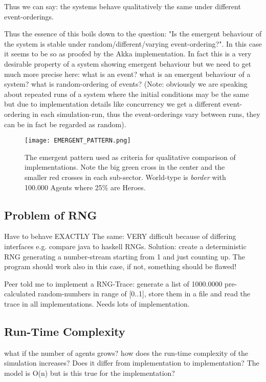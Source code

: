 Thus we can say: the systems behave qualitatively the same under different event-orderings.

Thus the essence of this boils down to the question: "Is the emergent behaviour of the system is stable under random/different/varying event-ordering?". In this case it seems to be so as proofed by the Akka implementation. In fact this is a very desirable property of a system showing emergent behaviour but we need to get much more precise here: what is an event? what is an emergent behaviour of a system? what is random-ordering of events? (Note: obviously we are speaking about repeated runs of a system where the initial conditions may be the same but due to implementation details like concurrency we get a different event-ordering in each simulation-run, thus the event-orderings vary between runs, they can be in fact be regarded as random).

\begin{figure}[H]
	\centering
  \texttt{[image: EMERGENT\_PATTERN.png]}
  	\caption{The emergent pattern used as criteria for qualitative comparison of implementations. Note the big green cross in the center and the smaller red crosses in each sub-sector. World-type is \textit{border} with 100.000 Agents where 25\% are Heroes.}
	\label{fig:EMERGENT_PATTERN}
\end{figure}


\subsection{Problem of RNG}
Have to behave EXACTLY The same: VERY difficult because of differing interfaces e.g. compare java to haskell RNGs.
Solution: create a deterministic RNG generating a number-stream starting from 1 and just counting up. The program should work also in this case, if not, something should be flawed!

Peer told me to implement a RNG-Trace: generate a list of 1000.0000 pre-calculated random-numbers in range of [0..1], store them in a file and read the trace in all implementations. Needs lots of implementation.

\subsection{Run-Time Complexity}
what if the number of agents grows? how does the run-time complexity of the simulation increases? Does it differ from implementation to implementation? The model is O(n) but is this true for the implementation?

